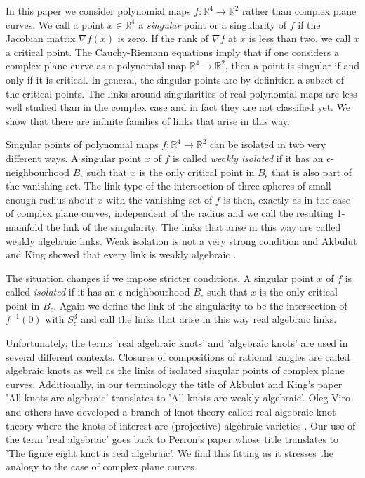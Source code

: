 \documentclass[notitlepage,12pt]{revtex4-1}
\begin{document}
In this paper we consider polynomial maps $f:\mathbb{R}^4\to\mathbb{R}^2$ rather than complex plane curves. We call a point $x\in\mathbb{R}^4$ a \textit{singular} point or a singularity of $f$ if the Jacobian matrix $\nabla f(x)$ is zero. If the rank of $\nabla f$ at $x$ is less than two, we call $x$ a critical point. The Cauchy-Riemann equations imply that if one considers a complex plane curve as a polynomial map $\mathbb{R}^4\to\mathbb{R}^2$, then a point is singular if and only if it is critical. In general, the singular points are by definition a subset of the critical points.  
The links around singularities of real polynomial maps are less well studied than in the complex case and in fact they are not classified yet. We show that there are infinite families of links that arise in this way. 

Singular points of polynomial maps $f:\mathbb{R}^4\to\mathbb{R}^2$ can be isolated in two very different ways. A singular point $x$ of $f$ is called \textit{weakly isolated} if it has an $\epsilon$-neighbourhood $B_{\epsilon}$ such that $x$ is the only critical point in $B_{\epsilon}$ that is also part of the vanishing set. 
The link type of the intersection of three-spheres of small enough radius about $x$ with the vanishing set of $f$ is then, exactly as in the case of complex plane curves, independent of the radius and we call the resulting 1-manifold the link of the singularity. The links that arise in this way are called weakly algebraic links. Weak isolation is not a very strong condition and Akbulut and King showed that every link is weakly algebraic \cite{ak:1981all}.

The situation changes if we impose stricter conditions. A singular point $x$ of $f$ is called \textit{isolated} if it has an $\epsilon$-neighbourhood $B_{\epsilon}$ such that $x$ is the only critical point in $B_{\epsilon}$. Again we define the link of the singularity to be the intersection of $f^{-1}(0)$ with $S^{3}_{\epsilon}$ and call the links that arise in this way real algebraic links.

Unfortunately, the terms 'real algebraic knots' and 'algebraic knots' are used in several different contexts. Closures of compositions of rational tangles are called algebraic knots \cite{conway:1970enumeration} as well as the links of isolated singular points of complex plane curves. Additionally, in our terminology the title of Akbulut and King's paper 'All knots are algebraic' \cite{ak:1981all} translates to 'All knots are weakly algebraic'. Oleg Viro and others have developed a branch of knot theory called real algebraic knot theory where the knots of interest are (projective) algebraic varieties \cite{viro:2001writhe}. Our use of the term 'real algebraic' goes back to Perron's paper \cite{perron:1982noeud} whose title translates to 'The figure eight knot is real algebraic'. We find this fitting as it stresses the analogy to the case of complex plane curves.  
\end{document}
